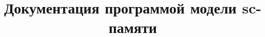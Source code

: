 \documentclass{scndocument}
\begin{document}
\DeactivateBG
\title{\centering
Документация программой модели sc-памяти}
\author{}
\maketitle

\normalsize

\setcounter{page}{3}

\ActivateBG
\begin{SCn}

\end{SCn}
\end{document}

